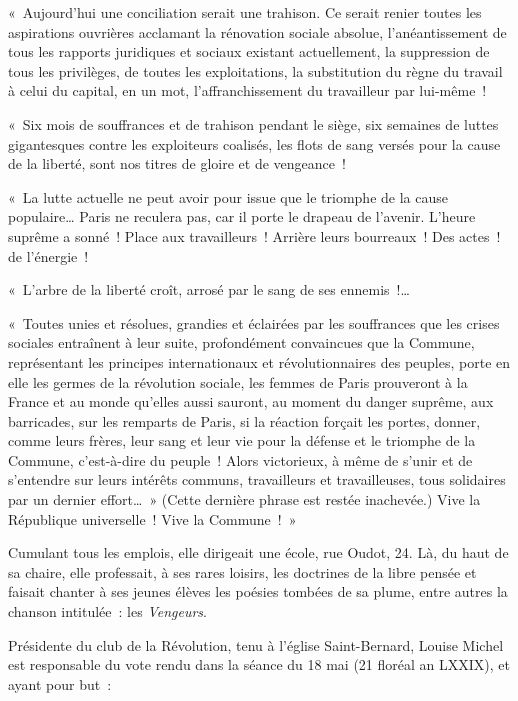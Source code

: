 \documentclass[french,twoside]{book} %
\begin{document}
« Aujourd’hui une conciliation serait une trahison. Ce serait renier toutes les aspirations ouvrières acclamant la rénovation sociale absolue, l’anéantissement de tous les rapports juridiques et sociaux existant actuellement, la suppression de tous les privilèges, de toutes les exploitations, la substitution du règne du travail à celui du capital, en un mot, l’affranchissement du travailleur par lui-même !\par
« Six mois de souffrances et de trahison pendant le siège, six semaines de luttes gigantesques contre les exploiteurs coalisés, les flots de sang versés pour la cause de la liberté, sont nos titres de gloire et de vengeance !\par
« La lutte actuelle ne peut avoir pour issue que le triomphe de la cause populaire… Paris ne reculera pas, car il porte le drapeau de l’avenir. L’heure suprême a sonné ! Place aux travailleurs ! Arrière leurs bourreaux ! Des actes ! de l’énergie !\par
« L’arbre de la liberté croît, arrosé par le sang de ses ennemis !…\par
« Toutes unies et résolues, grandies et éclairées par les souffrances que les crises sociales entraînent à leur suite, profondément convaincues que la Commune, représentant les principes internationaux et révolutionnaires des peuples, porte en elle les germes de la révolution sociale, les femmes de Paris prouveront à la France et au monde qu’elles aussi sauront,  au moment du danger suprême, aux barricades, sur les remparts de Paris, si la réaction forçait les portes, donner, comme leurs frères, leur sang et leur vie pour la défense et le triomphe de la Commune, c’est-à-dire du peuple ! Alors victorieux, à même de s’unir et de s’entendre sur leurs intérêts communs, travailleurs et travailleuses, tous solidaires par un dernier effort… » (Cette dernière phrase est restée inachevée.) Vive la République universelle ! Vive la Commune ! »\par
\bigbreak
\noindent Cumulant tous les emplois, elle dirigeait une école, rue Oudot, 24. Là, du haut de sa chaire, elle professait, à ses rares loisirs, les doctrines de la libre pensée et faisait chanter à ses jeunes élèves les poésies tombées de sa plume, entre autres la chanson intitulée : les \emph{Vengeurs}.\par
Présidente du club de la Révolution, tenu à l’église Saint-Bernard, Louise Michel est responsable du vote rendu dans la séance du 18 mai (21 floréal an LXXIX), et ayant pour but :\par
\end{document}
